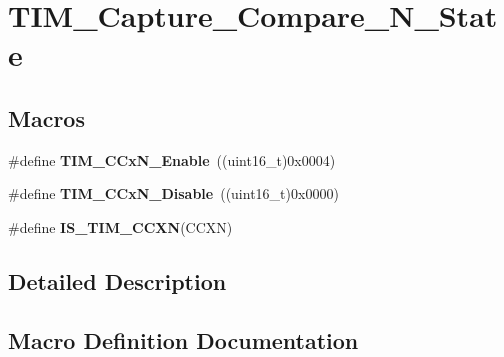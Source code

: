 \hypertarget{group___t_i_m___capture___compare___n___state}{}\section{T\+I\+M\+\_\+\+Capture\+\_\+\+Compare\+\_\+\+N\+\_\+\+State}
\label{group___t_i_m___capture___compare___n___state}
\subsection*{Macros}
\begin{DoxyCompactItemize}
\item 
\#define {\bfseries T\+I\+M\+\_\+\+C\+Cx\+N\+\_\+\+Enable}~((uint16\+\_\+t)0x0004)\hypertarget{group___t_i_m___capture___compare___n___state_gab534ddf23d317eb912564292c1cede2d}{}\label{group___t_i_m___capture___compare___n___state_gab534ddf23d317eb912564292c1cede2d}

\item 
\#define {\bfseries T\+I\+M\+\_\+\+C\+Cx\+N\+\_\+\+Disable}~((uint16\+\_\+t)0x0000)\hypertarget{group___t_i_m___capture___compare___n___state_ga0d7d46aeba33ed197aa39775bc527d7d}{}\label{group___t_i_m___capture___compare___n___state_ga0d7d46aeba33ed197aa39775bc527d7d}

\item 
\#define {\bfseries I\+S\+\_\+\+T\+I\+M\+\_\+\+C\+C\+XN}(C\+C\+XN)
\end{DoxyCompactItemize}


\subsection{Detailed Description}


\subsection{Macro Definition Documentation}
